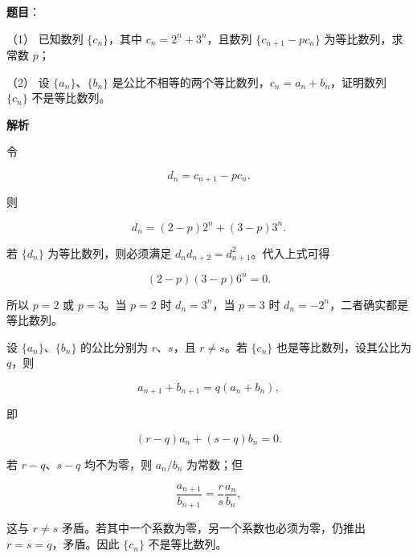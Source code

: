 \begin{answer}

\textbf{题目}：

（1） 已知数列 $\{c_n\}$，其中 $c_n=2^n+3^n$，且数列 $\{c_{n+1}-pc_n\}$ 为等比数列，求常数 $p$；

（2） 设 $\{a_n\}$、$\{b_n\}$ 是公比不相等的两个等比数列，$c_n=a_n+b_n$，证明数列 $\{c_n\}$ 不是等比数列。

\textbf{解析}


令

\nopagebreak[4]
\[
d_n=c_{n+1}-pc_n.
\]

则

\nopagebreak[4]
\[
d_n=(2-p)2^n+(3-p)3^n.
\]

若 $\{d_n\}$ 为等比数列，则必须满足 $d_nd_{n+2}=d_{n+1}^2$。代入上式可得

\nopagebreak[4]
\[
(2-p)(3-p)6^n=0.
\]

所以 $p=2$ 或 $p=3$。当 $p=2$ 时 $d_n=3^n$，当 $p=3$ 时 $d_n=-2^n$，二者确实都是等比数列。


设 $\{a_n\}$、$\{b_n\}$ 的公比分别为 $r$、$s$，且 $r\ne s$。若 $\{c_n\}$ 也是等比数列，设其公比为 $q$，则

\nopagebreak[4]
\[
a_{n+1}+b_{n+1}=q(a_n+b_n),
\]

即

\nopagebreak[4]
\[
(r-q)a_n+(s-q)b_n=0.
\]

若 $r-q$、$s-q$ 均不为零，则 $a_n/b_n$ 为常数；但

\nopagebreak[4]
\[
\frac{a_{n+1}}{b_{n+1}}=\frac rs\frac{a_n}{b_n},
\]

这与 $r\ne s$ 矛盾。若其中一个系数为零，另一个系数也必须为零，仍推出 $r=s=q$，矛盾。因此 $\{c_n\}$ 不是等比数列。



\end{answer}
